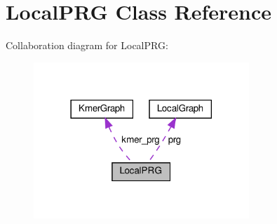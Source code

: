 \hypertarget{classLocalPRG}{}\section{Local\+P\+RG Class Reference}
\label{classLocalPRG}


Collaboration diagram for Local\+P\+RG\+:\nopagebreak
\begin{figure}[H]
\begin{center}
\leavevmode
\includegraphics[width=230pt]{classLocalPRG__coll__graph}
\end{center}
\end{figure}
